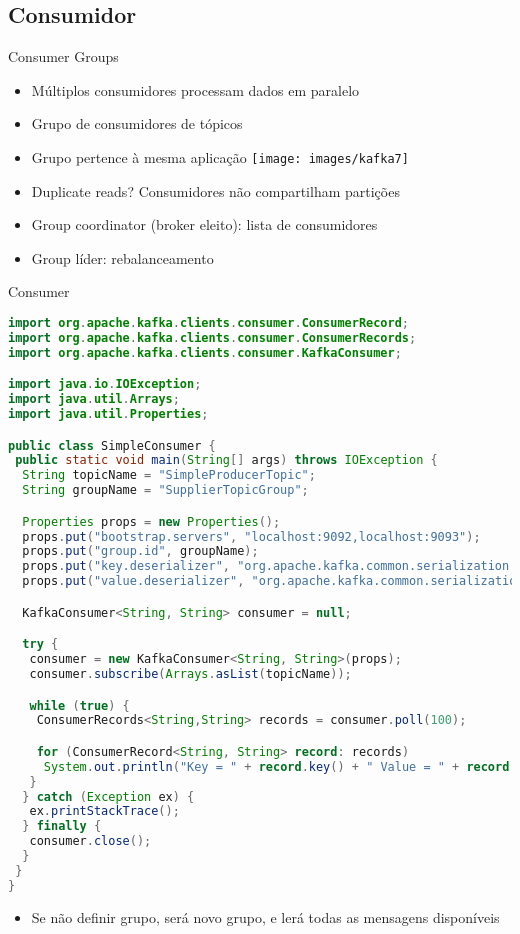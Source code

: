 \subsection{Consumidor}

\begin{frame}{Consumer Groups}
\begin{itemize}
	\item Múltiplos consumidores processam dados em paralelo
	\item Grupo de consumidores de tópicos
	\item Grupo pertence à mesma aplicação
	\texttt{[image: images/kafka7]}
	\item Duplicate reads? Consumidores não compartilham partições
	\item Group coordinator (broker eleito): lista de consumidores
	\item Group líder: rebalanceamento
\end{itemize}
\end{frame}

\begin{frame}{Consumer}
\begin{lstlisting}[language=Java]
import org.apache.kafka.clients.consumer.ConsumerRecord;
import org.apache.kafka.clients.consumer.ConsumerRecords;
import org.apache.kafka.clients.consumer.KafkaConsumer;

import java.io.IOException;
import java.util.Arrays;
import java.util.Properties;

public class SimpleConsumer {
 public static void main(String[] args) throws IOException {
  String topicName = "SimpleProducerTopic";
  String groupName = "SupplierTopicGroup";

  Properties props = new Properties();
  props.put("bootstrap.servers", "localhost:9092,localhost:9093");
  props.put("group.id", groupName);
  props.put("key.deserializer", "org.apache.kafka.common.serialization.StringDeserializer");
  props.put("value.deserializer", "org.apache.kafka.common.serialization.StringDeserializer");

  KafkaConsumer<String, String> consumer = null;

  try {
   consumer = new KafkaConsumer<String, String>(props);
   consumer.subscribe(Arrays.asList(topicName));

   while (true) {
    ConsumerRecords<String,String> records = consumer.poll(100);

    for (ConsumerRecord<String, String> record: records)
     System.out.println("Key = " + record.key() + " Value = " + record.value());
   }
  } catch (Exception ex) {
   ex.printStackTrace();
  } finally {
   consumer.close();
  }
 }
}
\end{lstlisting}

\begin{itemize}
	\item Se não definir grupo, será novo grupo, e lerá todas as mensagens disponíveis
\end{itemize}
\end{frame}


